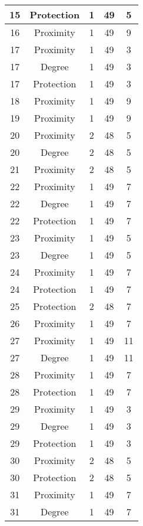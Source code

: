 \documentclass[results.tex]{subfiles}
\begin{document}
\begin{center}
\begin{tabular}{| c || c | c | c | c |}
    \hline
    15 & Protection & 1 & 49 & 5 \\ 
    \hline
    16 & Proximity & 1 & 49 & 9 \\ 
    \hline
    17 & Proximity & 1 & 49 & 3 \\ 
    \hline
    17 & Degree & 1 & 49 & 3 \\ 
    \hline
    17 & Protection & 1 & 49 & 3 \\ 
    \hline
    18 & Proximity & 1 & 49 & 9 \\ 
    \hline
    19 & Proximity & 1 & 49 & 9 \\ 
    \hline
    20 & Proximity & 2 & 48 & 5 \\ 
    \hline
    20 & Degree & 2 & 48 & 5 \\ 
    \hline
    21 & Proximity & 2 & 48 & 5 \\ 
    \hline
    22 & Proximity & 1 & 49 & 7 \\ 
    \hline
    22 & Degree & 1 & 49 & 7 \\ 
    \hline
    22 & Protection & 1 & 49 & 7 \\ 
    \hline
    23 & Proximity & 1 & 49 & 5 \\ 
    \hline
    23 & Degree & 1 & 49 & 5 \\ 
    \hline
    24 & Proximity & 1 & 49 & 7 \\ 
    \hline
    24 & Protection & 1 & 49 & 7 \\ 
    \hline
    25 & Protection & 2 & 48 & 7 \\ 
    \hline
    26 & Proximity & 1 & 49 & 7 \\ 
    \hline
    27 & Proximity & 1 & 49 & 11 \\ 
    \hline
    27 & Degree & 1 & 49 & 11 \\ 
    \hline
    28 & Proximity & 1 & 49 & 7 \\ 
    \hline
    28 & Protection & 1 & 49 & 7 \\ 
    \hline
    29 & Proximity & 1 & 49 & 3 \\ 
    \hline
    29 & Degree & 1 & 49 & 3 \\ 
    \hline
    29 & Protection & 1 & 49 & 3 \\ 
    \hline
    30 & Proximity & 2 & 48 & 5 \\ 
    \hline
    30 & Protection & 2 & 48 & 5 \\ 
    \hline
    31 & Proximity & 1 & 49 & 7 \\ 
    \hline
    31 & Degree & 1 & 49 & 7 \\ 
    \hline

\end{tabular}
\end{center}
\end{document}

